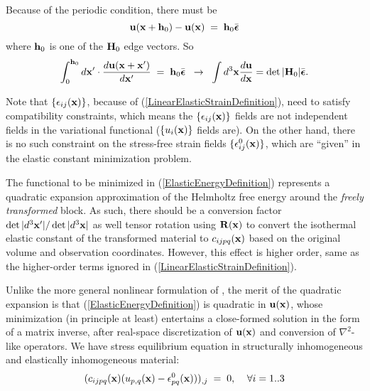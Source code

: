 \documentclass[12pt]{article}
\def\bmath#1{\mbox{\boldmath$#1$}}
\begin{document}
Because of the periodic condition, there must be 
\begin{equation}
 {\bf u}({\bf x}+{\bf
h}_0)-{\bf u}({\bf x}) \;=\; {\bf h}_0\bar{\bmath{\epsilon}}
\end{equation}
where ${\bf
h}_0$ is one of the ${\bf H}_0$ edge vectors.  So
\begin{equation}
 \int_0^{{\bf h}_0} d{\bf x}^\prime\cdot 
\frac{d{\bf u}({\bf x}+{\bf x}^\prime)}{d{\bf x}^\prime} 
 \;=\; 
 {\bf h}_0\bar{\bmath{\epsilon}}  \;\;\rightarrow\;\;
 \int d^3{\bf x} \frac{d{\bf u}}{d{\bf x}} =  \det|{\bf H}_0| 
 \bar{\bmath{\epsilon}}.
\end{equation}

Note that $\{\epsilon_{ij}({\bf x})\}$, because of
(\ref{LinearElasticStrainDefinition}), need to satisfy compatibility
constraints, which means the $\{\epsilon_{ij}({\bf x})\}$ fields are
not independent fields in the variational functional ($\{u_i({\bf
x})\}$ fields are). On the other hand, there is no such constraint on
the stress-free strain fields $\{\epsilon^0_{ij}({\bf x})\}$, which
are ``given'' in the elastic constant minimization problem.

The functional to be minimized in (\ref{ElasticEnergyDefinition})
represents a quadratic expansion approximation of the Helmholtz free
energy \cite{LiPhDThesis00} around the {\em freely transformed} block.
As such, there should be a conversion factor $\det|d^3{\bf
x}^\prime|/\det|d^3{\bf x}|$ as well tensor rotation using ${\bf
R}({\bf x})$ to convert the isothermal elastic constant of the
transformed material to $c_{ijpq}({\bf x})$ based on the original
volume and observation coordinates.  However, this effect is higher
order, same as the higher-order terms ignored in
(\ref{LinearElasticStrainDefinition}).

Unlike the more general nonlinear formulation of \cite{Jagla07}, the
merit of the quadratic expansion is that
(\ref{ElasticEnergyDefinition}) is quadratic in ${\bf u}({\bf x})$,
whose minimization (in principle at least) entertains a close-formed
solution in the form of a matrix inverse, after real-space
discretization of ${\bf u}({\bf x})$ and conversion of $\nabla^2$-like
operators. We have stress equilibrium equation in structurally
inhomogeneous and elastically inhomogeneous material:
\begin{equation}
 ( c_{ijpq}({\bf x}) 
  ( u_{p,q}({\bf x}) - \epsilon^0_{pq}({\bf x}) ))_{,j} \;=\; 0, 
  \;\;\;\;
  \forall i=1..3
 \label{StressEquilibrium}
\end{equation}
\end{document}
